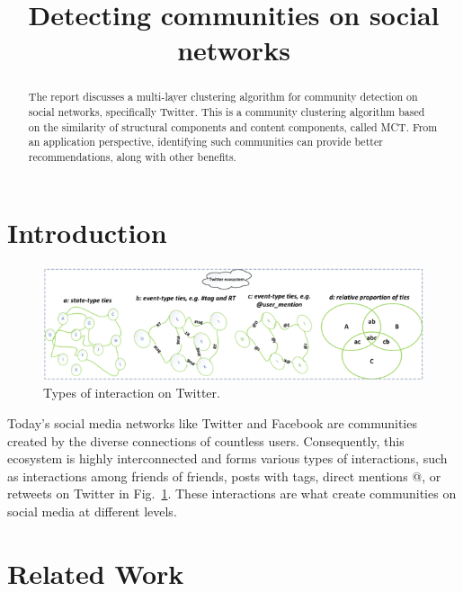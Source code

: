 \documentclass[conference]{IEEEtran}
\begin{document}
\title{Detecting communities on social networks\\
}

\author{
}

\maketitle

\begin{abstract}
    The report discusses a multi-layer clustering algorithm for community detection on social networks, specifically Twitter.
    This is a community clustering algorithm based on the similarity of structural components and content components, called MCT.
    From an application perspective, identifying such communities can provide better recommendations, along with other benefits.
\end{abstract}

\section{Introduction}
\begin{figure}[htbp]
    \centerline{\includegraphics[scale=0.5]{fig1.png}}
    \caption{Types of interaction on Twitter.}
    \label{fig1}
\end{figure}

Today's social media networks like Twitter and Facebook are communities created by the diverse connections of countless users.
Consequently, this ecosystem is highly interconnected and forms various types of interactions, such as interactions among friends of friends, posts with tags, direct mentions @, or retweets on Twitter in Fig.~\ref{fig1}.
These interactions are what create communities on social media at different levels.

\section{Related Work}
\end{document}
